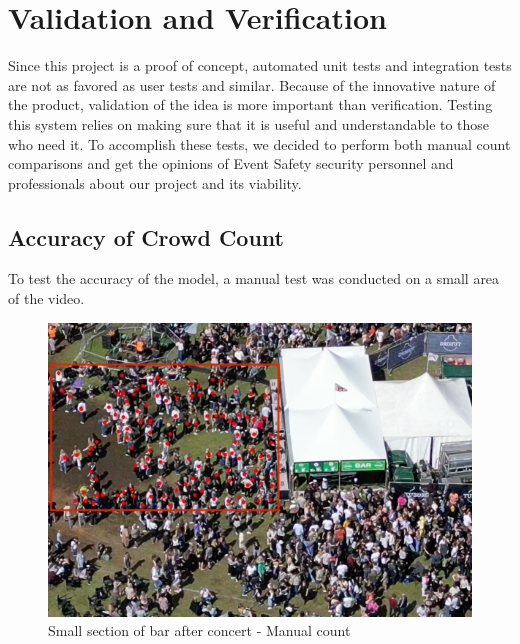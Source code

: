 \documentclass[
]{article}
\begin{document}
\hypertarget{sec-validation-verification}{%
\section{Validation and
Verification}\label{sec-validation-verification}}

Since this project is a proof of concept, automated unit tests and
integration tests are not as favored as user tests and similar. Because
of the innovative nature of the product, validation of the idea is more
important than verification. Testing this system relies on making sure
that it is useful and understandable to those who need it. To accomplish
these tests, we decided to perform both manual count comparisons and get
the opinions of Event Safety security personnel and professionals about
our project and its viability.

\hypertarget{sec-accuracy}{%
\subsection{Accuracy of Crowd Count}\label{sec-accuracy}}

To test the accuracy of the model, a manual test was conducted on a
small area of the video.

\begin{figure}

{\centering \includegraphics{../images/manual-count1.png}

}

\caption{\label{fig-manual-count1}Small section of bar after concert -
Manual count}

\end{figure}
\end{document}
